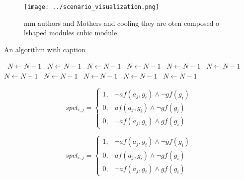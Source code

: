 \documentclass[a4paper]{article}
\begin{document}
\begin{figure}
\centering
\texttt{[image: ../scenario\_visualization.png]}
\caption{ mm authors and Mothers and cooling they are oten composed o lshaped modules cubic module
}
\end{figure}
 
\begin{algorithm}
\caption{An algorithm with caption}
\begin{algorithmic}
\    \State $N \gets N - 1$
\    \State $N \gets N - 1$
\    \State $N \gets N - 1$
\    \State $N \gets N - 1$
\    \State $N \gets N - 1$
\    \State $N \gets N - 1$
\    \State $N \gets N - 1$
\    \State $N \gets N - 1$
\    \State $N \gets N - 1$
\    \State $N \gets N - 1$
\    \State $N \gets N - 1$
\EndWhile
\end{algorithmic}
\end{algorithm}

\begin{equation}
spct_{i,j} =
\begin{cases}
1, & \text{$\neg af(a_j,g_i) \wedge \neg gf(g_i)$}\\
0, & \text{$af(a_j,g_i) \wedge \neg gf(g_i)$}\\
0, & \text{$\neg af(a_j,g_i) \wedge gf(g_i)$}
\end{cases}
\end{equation}

\begin{equation}
spct_{i,j} =
\begin{cases}
1, & \text{$\neg af(a_j,g_i) \wedge \neg gf(g_i)$}\\
0, & \text{$af(a_j,g_i) \wedge \neg gf(g_i)$}\\
0, & \text{$\neg af(a_j,g_i) \wedge gf(g_i)$}
\end{cases}
\end{equation}
\end{document}
